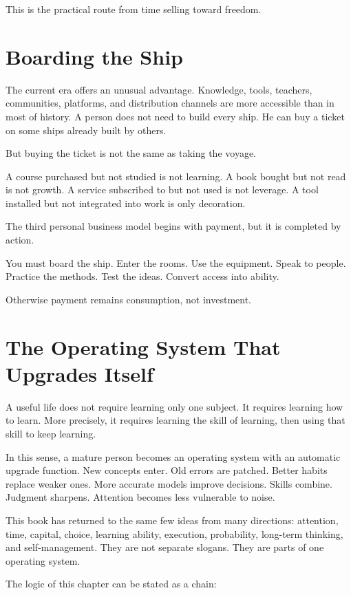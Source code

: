 This is the practical route from time selling toward freedom.

\section*{Boarding the Ship}

The current era offers an unusual advantage. Knowledge, tools, teachers, communities, platforms, and distribution channels are more accessible than in most of history. A person does not need to build every ship. He can buy a ticket on some ships already built by others.

But buying the ticket is not the same as taking the voyage.

A course purchased but not studied is not learning. A book bought but not read is not growth. A service subscribed to but not used is not leverage. A tool installed but not integrated into work is only decoration.

The third personal business model begins with payment, but it is completed by action.

You must board the ship. Enter the rooms. Use the equipment. Speak to people. Practice the methods. Test the ideas. Convert access into ability.

Otherwise payment remains consumption, not investment.

\section*{The Operating System That Upgrades Itself}

A useful life does not require learning only one subject. It requires learning how to learn. More precisely, it requires learning the skill of learning, then using that skill to keep learning.

In this sense, a mature person becomes an operating system with an automatic upgrade function. New concepts enter. Old errors are patched. Better habits replace weaker ones. More accurate models improve decisions. Skills combine. Judgment sharpens. Attention becomes less vulnerable to noise.

This book has returned to the same few ideas from many directions: attention, time, capital, choice, learning ability, execution, probability, long-term thinking, and self-management. They are not separate slogans. They are parts of one operating system.

The logic of this chapter can be stated as a chain:

